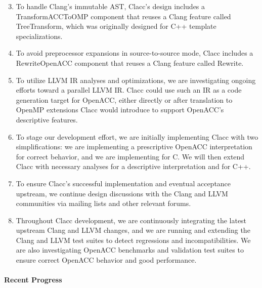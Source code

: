 \vspace{-1em}

\begin{enumerate}

\setcounter{enumi}{2}

\item To handle Clang's immutable AST, Clacc's design includes a
TransformACCToOMP component that reuses a Clang feature called
TreeTransform, which was originally designed for C++ template
specializations.

\item To avoid preprocessor expansions in source-to-source mode, Clacc
includes a RewriteOpenACC component that reuses a Clang feature called
Rewrite.

\item To utilize LLVM IR analyses and optimizations, we are
investigating ongoing efforts toward a parallel LLVM IR.  Clacc could
use such an IR as a code generation target for OpenACC, either
directly or after translation to OpenMP extensions Clacc would
introduce to support OpenACC's descriptive features.

\item To stage our development effort, we are initially implementing
Clacc with two simplifications: we are implementing a prescriptive
OpenACC interpretation for correct behavior, and we are implementing
for C.  We will then extend Clacc with necessary analyses for a
descriptive interpretation and for C++.

\item To ensure Clacc's successful implementation and eventual acceptance
upstream, we continue design discussions with the Clang and LLVM
communities via mailing lists and other relevant forums.

\item Throughout Clacc development, we are continuously integrating the
latest upstream Clang and LLVM changes, and we are running and
extending the Clang and LLVM test suites to detect regressions and
incompatibilities.  We are also investigating OpenACC
benchmarks \cite{specAccel} and validation test
suites \cite{openACCValidationSuite} to ensure correct OpenACC
behavior and good performance.

\end{enumerate}


\paragraph{Recent Progress}

